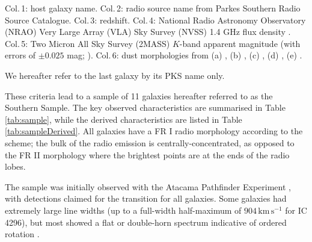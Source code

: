 \begin{table}
\begin{threeparttable}
\begin{tabular}{l c c c c l}
			\hline
			\hline
		\end{tabular}
		\begin{tablenotes}
		\footnotesize
		\note Col.\,1: host galaxy name. Col.\,2: radio source name from Parkes Southern Radio Source Catalogue. Col.\,3: redshift. Col.\,4: National Radio Astronomy Observatory (NRAO) Very Large Array (VLA) Sky Survey (NVSS) 1.4 GHz flux density \citep{Condon1998}. Col.\,5: Two Micron All Sky Survey (2MASS) $K$-band apparent magnitude (with errors of $\pm 0.025$ mag; \citealt{Skrutskie2006}). Col.\,6: dust morphologies from (a) \citet{Govoni2000}, (b) \citet{Lauer2005}, (c) \citet{Bettoni2001}, (d) \citet{Sandage1979}, (e) \citet{Colbert2001}. 
		\item We hereafter refer to the last galaxy by its PKS name only.
		\end{tablenotes}
	\end{threeparttable}
	\end{table}

	These criteria lead to a sample of 11 galaxies hereafter referred to as the Southern Sample. The key observed characteristics are summarised in Table \ref{tab:sample}, while the derived characteristics are listed in Table \ref{tab:sampleDerived}. All galaxies have a FR I radio morphology according to the \citet{Fanaroff1974} scheme; the bulk of the radio emission is centrally-concentrated, as opposed to the FR II morphology where the brightest points are at the ends of the radio lobes. 
	
	The sample was initially observed with the Atacama Pathfinder Experiment \citep[APEX; ][]{Gusten2006}, with detections claimed for the  transition for all galaxies. Some galaxies had extremely large line widths (up to a full-width half-maximum of $904 \, \mathrm{km \, s^{-1}}$ for IC 4296), but most showed a flat or double-horn spectrum indicative of ordered rotation \citep{Prandoni2012}.

